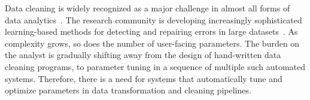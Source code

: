 



Data cleaning is widely recognized as a major challenge in almost all forms of data analytics~\cite{nytimes}. 
The research community is developing increasingly sophisticated learning-based methods for detecting and repairing errors in large datasets~\cite{dc, rekatsinas2017holoclean, DBLP:journals/pvldb/KrishnanWWFG16, DBLP:conf/sigmod/ChuIKW16, mudgal2018deep, doan2018toward}.
As complexity grows, so does the number of user-facing parameters.
The burden on the analyst is gradually shifting away from the design of hand-written data cleaning programs, to parameter tuning in a sequence of multiple such automated systems.
Therefore, there is a need for systems that automatically tune and optimize parameters in data transformation and cleaning pipelines.



% 
% 
% 
% 
% 



